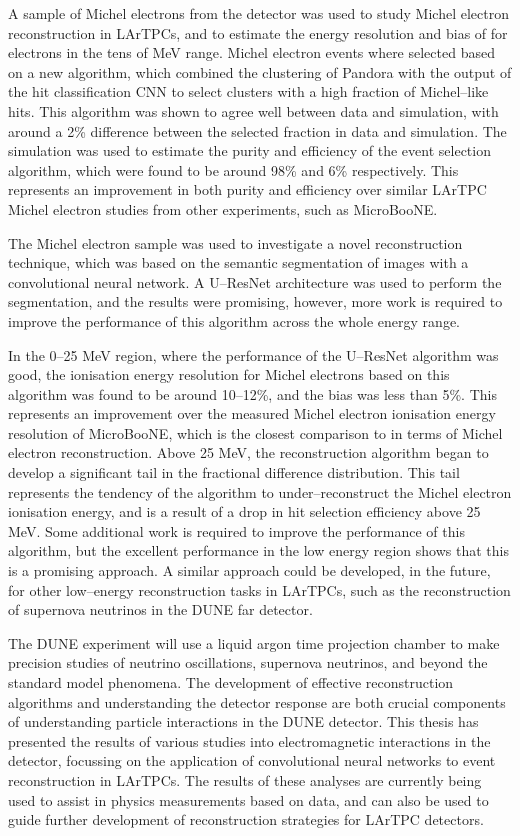 A sample of Michel electrons from the \protodune{} detector was used to study
Michel electron reconstruction in LArTPCs, and to estimate the energy resolution
and bias of \protodune{} for electrons in the tens of MeV range. Michel electron
events where selected based on a new algorithm, which combined the clustering of
Pandora with the output of the hit classification CNN to select clusters with a
high fraction of Michel--like hits. This algorithm was shown to agree well
between data and simulation, with around a 2\% difference between the selected
fraction in data and simulation. The simulation was used to estimate the purity
and efficiency of the event selection algorithm, which were found to be around
98\% and 6\% respectively. This represents an improvement in both purity and
efficiency over similar LArTPC Michel electron studies from other experiments,
such as MicroBooNE.

The Michel electron sample was used to investigate a novel reconstruction
technique, which was based on the semantic segmentation of images with a
convolutional neural network. A U--ResNet architecture was used to perform the
segmentation, and the results were promising, however, more work is required to
improve the performance of this algorithm across the whole energy range. 

In the 0--25 MeV region, where the performance of the U--ResNet algorithm was 
good, the ionisation energy resolution for Michel electrons based on this 
algorithm was found to be around 10--12\%, and the bias was less than 
5\%. This represents an improvement over the measured Michel electron ionisation
energy resolution of MicroBooNE, which is the closest comparison to \protodune{}
in terms of Michel electron reconstruction. Above 25 MeV, the reconstruction 
algorithm began to develop a significant tail in the fractional difference 
distribution. This tail represents the tendency of the algorithm to 
under--reconstruct the Michel electron ionisation energy, and is a result of a 
drop in hit selection efficiency above 25 MeV. Some additional work
is required to improve the performance of this algorithm, but the excellent
performance in the low energy region shows that this is a promising approach. A
similar approach could be developed, in the future, for other low--energy 
reconstruction tasks in LArTPCs, such as the reconstruction of supernova 
neutrinos in the DUNE far detector.

The DUNE experiment will use a liquid argon time projection chamber to make 
precision studies of neutrino oscillations, supernova neutrinos, and beyond 
the standard model phenomena. The development of effective reconstruction 
algorithms and understanding the detector response are both crucial components 
of understanding particle interactions in the DUNE detector. This thesis has 
presented the results of various studies into electromagnetic interactions in 
the \protodune{} detector, focussing on the application of convolutional 
neural networks to event reconstruction in LArTPCs. The results of these 
analyses are currently being used to assist in physics measurements based on 
\protodune{} data, and can also be used to guide further development of 
reconstruction strategies for LArTPC detectors.
